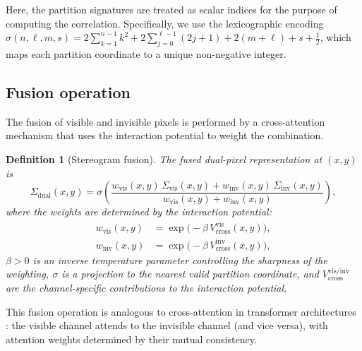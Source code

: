 \documentclass[11pt,twocolumn,a4paper]{article}
\newtheorem{definition}{Definition}
\newcommand{\Sigvis}{\Sigma_{\mathrm{vis}}}
\newcommand{\Siginv}{\Sigma_{\mathrm{inv}}}
\begin{document}
Here, the partition signatures are treated as scalar indices for the purpose of computing the correlation.
Specifically, we use the lexicographic encoding $\sigma(n,\ell,m,s) = 2\sum_{k=1}^{n-1}k^2 + 2\sum_{j=0}^{\ell-1}(2j+1) + 2(m+\ell) + s + \tfrac{1}{2}$, which maps each partition coordinate to a unique non-negative integer.

\subsection{Fusion operation}

The fusion of visible and invisible pixels is performed by a cross-attention mechanism that uses the interaction potential to weight the combination.

\begin{definition}[Stereogram fusion]\label{def:fusion}
The fused dual-pixel representation at $(x,y)$ is
\begin{equation}\label{eq:fusion}
\Sigma_{\mathrm{dual}}(x,y) = \sigma\left(\frac{w_{\mathrm{vis}}(x,y)\, \Sigvis(x,y) + w_{\mathrm{inv}}(x,y)\, \Siginv(x,y)}{w_{\mathrm{vis}}(x,y) + w_{\mathrm{inv}}(x,y)}\right),
\end{equation}
where the weights are determined by the interaction potential:
\begin{align}
w_{\mathrm{vis}}(x,y) &= \exp\bigl(-\beta\, V_{\mathrm{cross}}^{\mathrm{vis}}(x,y)\bigr), \label{eq:wvis} \\
w_{\mathrm{inv}}(x,y) &= \exp\bigl(-\beta\, V_{\mathrm{cross}}^{\mathrm{inv}}(x,y)\bigr), \label{eq:winv}
\end{align}
$\beta > 0$ is an inverse temperature parameter controlling the sharpness of the weighting, $\sigma$ is a projection to the nearest valid partition coordinate, and $V_{\mathrm{cross}}^{\mathrm{vis/inv}}$ are the channel-specific contributions to the interaction potential.
\end{definition}

This fusion operation is analogous to cross-attention in transformer architectures \citep{Vaswani2017}: the visible channel attends to the invisible channel (and vice versa), with attention weights determined by their mutual consistency.
\end{document}

